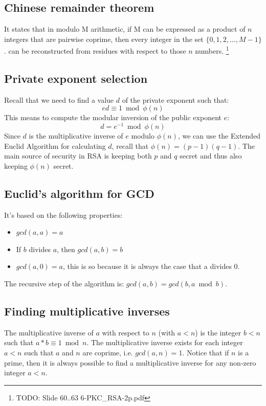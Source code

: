 \subsection{Chinese remainder theorem}

It states that in modulo M arithmetic, if M can be expressed as a product of $n$ integers that are pairwise coprime, then every integer in the set $\{0, 1, 2 , \ldots, M - 1\}$. can be reconstructed from residues with respect to those $n$ numbers. \footnote{TODO: Slide 60..63 6-PKC\_RSA-2p.pdf}

\subsection{Private exponent selection}

Recall that we need to find a value $d$ of the private exponent such that: \[e d \equiv 1 \bmod \phi(n)\] This means to compute the modular inversion of the public exponent $e$: \[d = e^{-1} \bmod \phi(n)\] Since $d$ is the multiplicative inverse of $e$ modulo $\phi(n)$, we can use the Extended Euclid Algorithm for calculating $d$, recall that $\phi(n) = (p - 1) (q - 1)$. The main source of security in RSA is keeping both $p$ and $q$ secret and thus also keeping $\phi(n)$ secret.


\subsection{Euclid's algorithm for GCD}

It's based on the following properties:
\begin{itemize}
	\item $gcd(a,a) = a$
	\item If $b$ divides $a$, then $gcd(a,b) = b$
	\item $gcd(a,0) = a$, this is so because it is always the case that a divides 0.
\end{itemize}
The recursive step of the algorithm is: $gcd(a,b) = gcd(b, a \bmod b)$.

\subsection{Finding multiplicative inverses}

The multiplicative inverse of $a$ with respect to $n$ (with $a<n$) is the integer $b<n$ such that $a * b \equiv 1 \bmod n$.  The multiplicative inverse exists for each integer $a<n$ such that $a$ and $n$ are coprime, i.e. $gcd (a,n) = 1$. Notice that if $n$ is a prime, then it is always possible to find a multiplicative inverse for any non-zero integer $a<n$.

